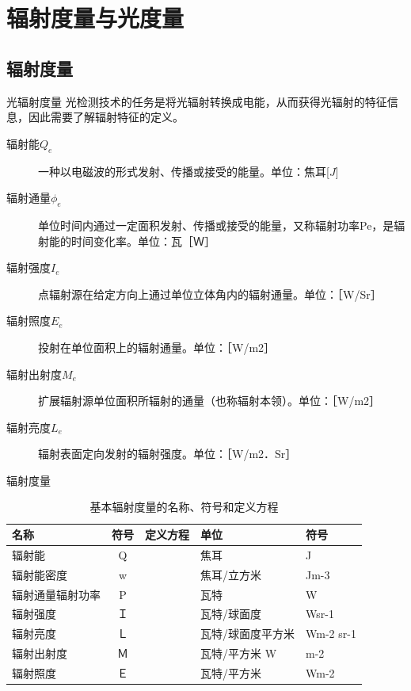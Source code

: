 \documentclass[trans]{beamer} %
\begin{document}
\section{辐射度量与光度量}
\subsection{辐射度量}
\begin{frame}{光辐射度量}
光检测技术的任务是将光辐射转换成电能，从而获得光辐射的特征信息，因此需要了解辐射特征的定义。
    
    \begin{description}

      \item[\alert{辐射能$Q_e$}] 一种以电磁波的形式发射、传播或接受的能量。单位：焦耳[$J$]
      \item[\alert{辐射通量$\phi_e$}]
单位时间内通过一定面积发射、传播或接受的能量，又称辐射功率Pe，是辐射能的时间变化率。单位：瓦［Ｗ］
       \item[\alert{辐射强度$I_e$}]
点辐射源在给定方向上通过单位立体角内的辐射通量。单位：［W/Sr］ 
      \item[\alert{辐射照度$E_e$}]
投射在单位面积上的辐射通量。单位：［W/m2］
      \item[\alert{辐射出射度$M_e$}]
扩展辐射源单位面积所辐射的通量（也称辐射本领）。单位：［W/m2］
      \item[\alert{辐射亮度$L_e$}]
辐射表面定向发射的辐射强度。单位：［W/m2．Sr］
     

  \end{description}
 \end{frame}

\begin{frame}[fragile]{辐射度量}
 \begin{table}

 \caption{基本辐射度量的名称、符号和定义方程}
\label{table:2}
  \begin{center}
\begin{tabular}{ |m{1.8cm}|c|m{2.8cm}|m{1.8cm}|m{1.8cm}| } 
\hline
名称& 符号&定义方程 &单位&符号\\ 
\hline
辐射能& Q& 	& 	焦耳& 	J
 \\ 
\hline
辐射能密度& w&			& 焦耳/立方米& Jm-3
 \\ 
\hline
辐射通量辐射功率&P	&		&瓦特	&W \\
\hline
辐射强度&	Ｉ&		&瓦特/球面度&	Wsr-1 \\
\hline
辐射亮度&	Ｌ&	 	&瓦特/球面度平方米	&Wm-2 sr-1\\
\hline
辐射出射度	&Ｍ&	&	瓦特/平方米	W&m-2\\
\hline
辐射照度&	Ｅ&		&瓦特/平方米&	Wm-2\\
\hline
\end{tabular}
\end{center}
     
 \end{table}
\end{frame}
\end{document}

